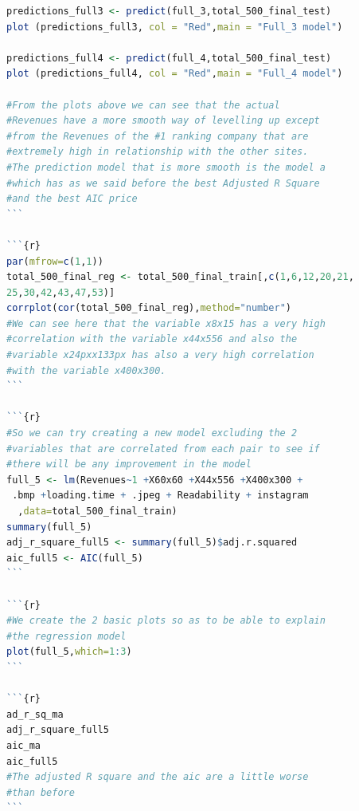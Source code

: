 \documentclass{article}
\begin{document}
\begin{lstlisting}[language=R]
predictions_full3 <- predict(full_3,total_500_final_test)
plot (predictions_full3, col = "Red",main = "Full_3 model")

predictions_full4 <- predict(full_4,total_500_final_test)
plot (predictions_full4, col = "Red",main = "Full_4 model")

#From the plots above we can see that the actual 
#Revenues have a more smooth way of levelling up except 
#from the Revenues of the #1 ranking company that are 
#extremely high in relationship with the other sites.
#The prediction model that is more smooth is the model a 
#which has as we said before the best Adjusted R Square 
#and the best AIC price
```

```{r}
par(mfrow=c(1,1))
total_500_final_reg <- total_500_final_train[,c(1,6,12,20,21,
25,30,42,43,47,53)]
corrplot(cor(total_500_final_reg),method="number")
#We can see here that the variable x8x15 has a very high 
#correlation with the variable x44x556 and also the 
#variable x24pxx133px has also a very high correlation 
#with the variable x400x300.
```

```{r}
#So we can try creating a new model excluding the 2 
#variables that are correlated from each pair to see if 
#there will be any improvement in the model
full_5 <- lm(Revenues~1 +X60x60 +X44x556 +X400x300 +
 .bmp +loading.time + .jpeg + Readability + instagram
  ,data=total_500_final_train)
summary(full_5)
adj_r_square_full5 <- summary(full_5)$adj.r.squared
aic_full5 <- AIC(full_5)
```

```{r}
#We create the 2 basic plots so as to be able to explain 
#the regression model
plot(full_5,which=1:3)
```

```{r}
ad_r_sq_ma
adj_r_square_full5 
aic_ma 
aic_full5 
#The adjusted R square and the aic are a little worse 
#than before
```
\end{lstlisting} 
\end{document}

